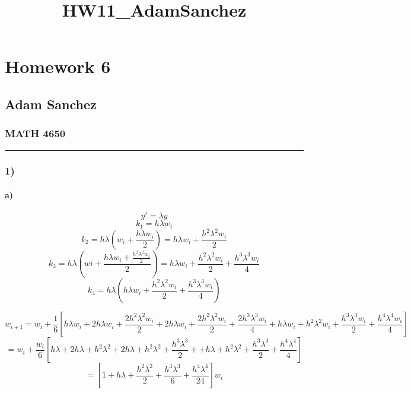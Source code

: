 \documentclass[11pt]{article}
\title{HW11\_AdamSanchez}
\begin{document}
    
    
    \maketitle
    
    

    
    \section{Homework 6}\label{homework-6}

\subsection{Adam Sanchez}\label{adam-sanchez}

\subsubsection{MATH 4650}\label{math-4650}

    \begin{center}\rule{0.5\linewidth}{\linethickness}\end{center}

    \subsubsection{1)}\label{section}

\paragraph{a)}\label{a}

\[y' = \lambda y\] \[k_1 = h\lambda w_i\]
\[k_2 = h\lambda \left(w_i + \frac{h\lambda w_i}{2}\right) = h\lambda w_i + \frac{h^2\lambda^2 w_i}{2}\]
\[k_3 = h\lambda \left(wi +\frac{h\lambda w_i + \frac{h^2\lambda^2 w_i}{2}}{2}\right) = h\lambda w_i + \frac{h^2\lambda^2 w_i}{2}+\frac{h^3\lambda^3 w_i}{4}\]
\[k_4 = h\lambda\left(h\lambda w_i + \frac{h^2\lambda^2 w_i}{2}+\frac{h^3\lambda^3 w_i}{4}\right)\]

\[w_{i+1} = w_i +\frac{1}{6}\left[ h\lambda w_i + 2h\lambda w_i + \frac{2h^2\lambda^2 w_i}{2} + 2h\lambda w_i + \frac{2h^2\lambda^2 w_i}{2}+\frac{2h^3\lambda^3 w_i}{4} + h\lambda w_i + h^2\lambda^2 w_i+ \frac{h^3\lambda^3 w_i}{2} + \frac{h^4\lambda^4 w_i}{4}\right]\]
\[ = w_i + \frac{w_i}{6}\left[h\lambda + 2h\lambda + h^2\lambda^2 + 2h\lambda + h^2\lambda^2 + \frac{h^3\lambda^3}{2} + + h\lambda + h^2\lambda^2 + \frac{h^3\lambda^3}{2} + \frac{h^4\lambda^4}{4}\right]\]
\[ = \left[1 + h\lambda + \frac{h^2\lambda^2}{2}+ \frac{h^3\lambda^3}{6}+\frac{h^4\lambda^4}{24}\right]w_i\]
\end{document}

